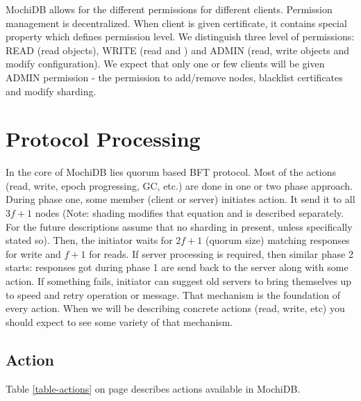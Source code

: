 \documentclass[letterpaper,twocolumn,10pt]{article}
\begin{document}
MochiDB allows for the different permissions for different clients. Permission management is decentralized. When client is given certificate, it contains special property which defines permission level. We distinguish three level of permissions: READ (read objects), WRITE (read and ) and ADMIN (read, write objects and modify configuration). We expect that only one or few clients will be given ADMIN permission - the permission to add/remove nodes, blacklist certificates and modify sharding.

\section{Protocol Processing}
In the core of MochiDB lies quorum based BFT protocol. Most of the actions (read, write, epoch progressing, GC, etc.) are done in one or two phase approach. During phase one, some member (client or server) initiates action. It send it to all $3f+1$ nodes (Note: shading modifies that equation and is described separately. For the future descriptions assume that no sharding in present, unless specifically stated so). Then, the initiator waits for $2f+1$ (quorum size) matching responses for write and $f+1$ for reads. If server processing is required, then similar phase 2 starts: responses got during phase 1 are send back to the server along with some action. If something fails, initiator can suggest old servers to bring themselves up to speed and retry operation or message.
That mechanism is the foundation of every action. When we will be describing concrete actions (read, write, etc) you should expect to see some variety of that mechanism.

\subsection{Action}

Table \ref{table-actions} on page \pageref{table-actions} describes actions available in MochiDB.

\begin{table}[]
\centering
\caption{MochiDB actions}
\label{table-actions}
\end{table}
\end{document}
